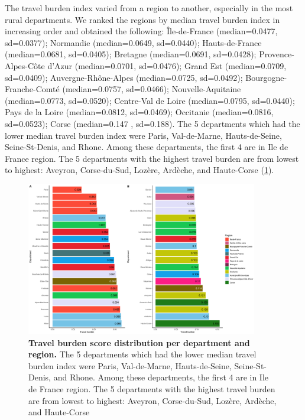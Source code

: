 The travel burden index varied from a region to another, especially in the most
rural departments. We ranked the regions by median travel burden index in
increasing order and obtained the following: Île-de-France (median=0.0477,
sd=0.0377); Normandie (median=0.0649, sd=0.0440); Hauts-de-France
(median=0.0681, sd=0.0405); Bretagne (median=0.0691, sd=0.0428);
Provence-Alpes-Côte d'Azur (median=0.0701, sd=0.0476); Grand Est (median=0.0709,
sd=0.0409); Auvergne-Rhône-Alpes (median=0.0725, sd=0.0492);
Bourgogne-Franche-Comté (median=0.0757, sd=0.0466); Nouvelle-Aquitaine
(median=0.0773, sd=0.0520); Centre-Val de Loire (median=0.0795, sd=0.0440); Pays
de la Loire (median=0.0812, sd=0.0469); Occitanie (median=0.0816, sd=0.0523);
Corse (median=0.147 , sd=0.188). The 5 departments which had the lower median
travel burden index were Paris, Val-de-Marne, Hauts-de-Seine, Seine-St-Denis,
and Rhone. Among these departments, the first 4 are in Ile de France region. The
5 departments with the highest travel burden are from lowest to highest:
Aveyron, Corse-du-Sud, Lozère, Ardèche, and Haute-Corse
(\cref{fig:routes-burden-departments-top-bottom-20}).

\begin{figure}[h!]
    \includegraphics[width=0.9\textwidth]{images/routes/sup_fig_2.png}
    \centering
    \caption{
        \textbf{Travel burden score distribution per department and region.}
        The 5 departments which had the lower median travel burden index were
        Paris, Val-de-Marne, Hauts-de-Seine, Seine-St-Denis, and Rhone. Among these
        departments, the first 4 are in Ile de France region. The 5 departments with the
        highest travel burden are from lowest to highest: Aveyron, Corse-du-Sud, Lozère,
        Ardèche, and Haute-Corse}
    \label{fig:routes-burden-departments-top-bottom-20}
\end{figure}

